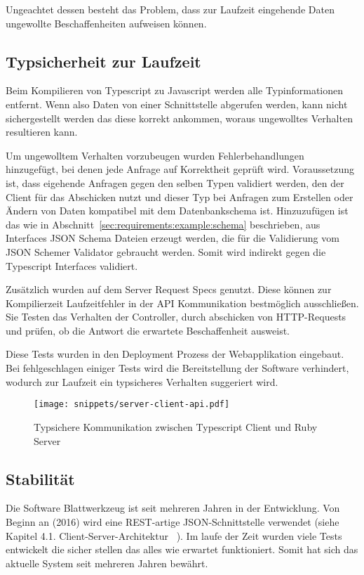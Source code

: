 Ungeachtet dessen besteht das Problem, dass zur Laufzeit eingehende Daten ungewollte Beschaffenheiten aufweisen können.

\subsection{Typsicherheit zur Laufzeit}
\label{sec:requirements:pros:typesafe-runtime}
Beim Kompilieren von Typescript zu Javascript werden alle Typinformationen entfernt.
Wenn also Daten von einer Schnittstelle abgerufen werden, kann nicht sichergestellt werden das diese korrekt ankommen, woraus
ungewolltes Verhalten resultieren kann.

Um ungewolltem Verhalten vorzubeugen wurden Fehlerbehandlungen hinzugefügt, bei denen jede Anfrage auf Korrektheit geprüft wird.
Voraussetzung ist, dass eigehende Anfragen gegen den selben Typen validiert werden,
den der Client für das Abschicken nutzt und dieser Typ bei Anfragen zum Erstellen oder Ändern von Daten kompatibel mit dem Datenbankschema ist.
Hinzuzufügen ist das wie in Abschnitt~\ref{sec:requirements:example:schema} beschrieben, aus Interfaces JSON Schema Dateien erzeugt werden,
die für die Validierung vom JSON Schemer Validator gebraucht werden. Somit wird indirekt gegen die Typescript Interfaces validiert.

Zusätzlich wurden auf dem Server Request Specs genutzt.
Diese können zur Kompilierzeit Laufzeitfehler in der API Kommunikation bestmöglich ausschließen.
Sie Testen das Verhalten der Controller, durch abschicken von HTTP-Requests und prüfen, ob die Antwort die erwartete Beschaffenheit ausweist. 

Diese Tests wurden in den Deployment Prozess der Webapplikation eingebaut. Bei fehlgeschlagen einiger Tests wird die Bereitstellung der Software
verhindert, wodurch zur Laufzeit ein typsicheres Verhalten suggeriert wird.

\begin{figure}[h!]
    \centering
    \texttt{[image: snippets/server-client-api.pdf]}
    \caption{Typsichere Kommunikation zwischen Typescript Client und Ruby Server}
    \label{req:typesafe:server-client-short}
\end{figure}

\subsection{Stabilität}
\label{sec:requirements:pros:stable}
Die Software Blattwerkzeug ist seit mehreren Jahren in der Entwicklung. Von Beginn an (2016) wird
eine REST-artige JSON-Schnittstelle verwendet (siehe Kapitel 4.1. Client-Server-Architektur ~\cite{riemer2016}).
Im laufe der Zeit wurden viele Tests entwickelt die sicher stellen das alles wie erwartet funktioniert.
Somit hat sich das aktuelle System seit mehreren Jahren bewährt.


